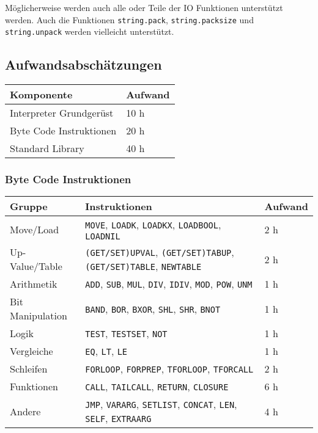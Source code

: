 \documentclass{article}
\begin{document}
Möglicherweise werden auch alle oder Teile der IO Funktionen unterstützt werden.\newline
Auch die Funktionen \texttt{string.pack}, \texttt{string.packsize} und \texttt{string.unpack} werden vielleicht unterstützt.

\subsection*{Aufwandsabschätzungen}\hypertarget{aufwandsabschätzungen}{}\label{aufwandsabschätzungen}

\begin{longtabu}{|X[l]|l|}
\hline
\bfseries Komponente & \bfseries Aufwand\\
\hline
Interpreter Grundgerüst & 10 h\\
Byte Code Instruktionen & 20 h\\
Standard Library & 40 h\\
\hline
\end{longtabu}

\pagebreak

\subsubsection*{Byte Code Instruktionen}\hypertarget{byte-code-instruktionen-1}{}\label{byte-code-instruktionen-1}

\begin{longtabu} to \textwidth {|l|X[l]|l|}
\hline
\bfseries Gruppe & \bfseries Instruktionen & \bfseries Aufwand\\
\hline
Move/Load & \texttt{MOVE}, \texttt{LOADK}, \texttt{LOADKX}, \texttt{LOADBOOL}, \texttt{LOADNIL} & 2 h\\
Up-Value/Table & \texttt{(GET/SET)UPVAL}, \texttt{(GET/SET)TABUP}, \texttt{(GET/SET)TABLE}, \texttt{NEWTABLE} & 2 h\\
Arithmetik & \texttt{ADD}, \texttt{SUB}, \texttt{MUL}, \texttt{DIV}, \texttt{IDIV}, \texttt{MOD}, \texttt{POW}, \texttt{UNM} & 1 h\\
Bit Manipulation & \texttt{BAND}, \texttt{BOR}, \texttt{BXOR}, \texttt{SHL}, \texttt{SHR}, \texttt{BNOT} & 1 h\\
Logik & \texttt{TEST}, \texttt{TESTSET}, \texttt{NOT} & 1 h\\
Vergleiche & \texttt{EQ}, \texttt{LT}, \texttt{LE} & 1 h\\
Schleifen & \texttt{FORLOOP}, \texttt{FORPREP}, \texttt{TFORLOOP}, \texttt{TFORCALL} & 2 h\\
Funktionen & \texttt{CALL}, \texttt{TAILCALL}, \texttt{RETURN}, \texttt{CLOSURE} & 6 h\\
Andere & \texttt{JMP}, \texttt{VARARG}, \texttt{SETLIST}, \texttt{CONCAT}, \texttt{LEN}, \texttt{SELF}, \texttt{EXTRAARG} & 4 h\\
\hline
\end{longtabu}
\end{document}
